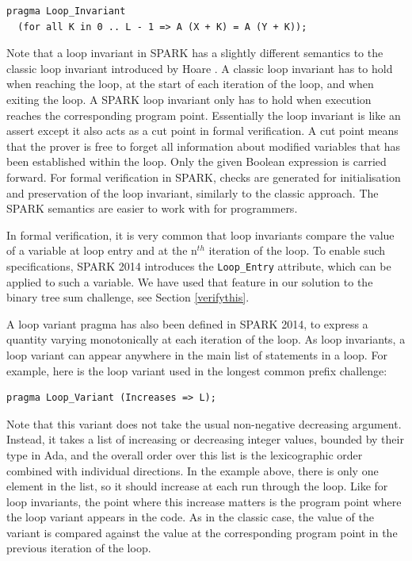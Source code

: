 \documentclass[sttt,final]{svjour}
\begin{document}
\begin{lstlisting}
pragma Loop_Invariant
  (for all K in 0 .. L - 1 => A (X + K) = A (Y + K));
\end{lstlisting}

Note that a loop invariant in SPARK has a slightly different semantics
to the classic loop invariant introduced by Hoare
\cite{hoare69cacm}. A classic loop invariant has to hold when reaching
the loop, at the start of each iteration of the loop, and when exiting
the loop. A SPARK loop invariant only has to hold when execution
reaches the corresponding program point. Essentially the loop
invariant is like an assert except it also acts as a cut point in
formal verification. A cut point means that the prover is free to
forget all information about modified variables that has been
established within the loop. Only the given Boolean expression is
carried forward. For formal verification in SPARK, checks are
generated for initialisation and preservation of the loop invariant,
similarly to the classic approach. The SPARK semantics are easier to
work with for programmers.

In formal verification, it is very common that loop invariants compare
the value of a variable at loop entry and at the n$^{th}$ iteration of
the loop. To enable such specifications, SPARK 2014 introduces the
\verb|Loop_Entry| attribute, which can be applied to such a
variable. We have used that feature in our solution to the binary tree sum
challenge, see Section \ref{verifythis}.

A loop variant pragma has also been defined in SPARK 2014, to express
a quantity varying monotonically at each iteration of the loop. As
loop invariants, a loop variant can appear anywhere in the main list
of statements in a loop. For example, here is the loop variant used in
the longest common prefix challenge:

\begin{lstlisting}
pragma Loop_Variant (Increases => L);
\end{lstlisting}

Note that this variant does not take the usual non-negative decreasing
argument. Instead, it takes a list of increasing or decreasing integer
values, bounded by their type in Ada, and the overall order over this
list is the lexicographic order combined with individual
directions. In the example above, there is only one element in the
list, so it should increase at each run through the loop. Like for
loop invariants, the point where this increase matters is the program
point where the loop variant appears in the code. As in the classic
case, the value of the variant is compared against the value at the
corresponding program point in the previous iteration of the loop.
\end{document}
